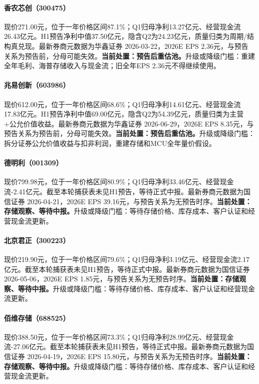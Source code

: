 \paragraph{香农芯创（300475）}
现价271.00元，位于一年价格区间87.1\%；Q1归母净利13.27亿元、经营现金流26.43亿元。H1预告净利中值37.50亿元，隐含Q2为24.23亿元，质量归类为周期/结构真兑现。最新券商元数据为华鑫证券 2026-03-22，2026E EPS 2.36元，与预告关系为预告前，分母可能失效。\textbf{当前处置：预告后重估池。}升级或降级门槛：重建全年毛利、海普存储收入与现金流；旧全年EPS 2.36元不得继续使用。

\paragraph{兆易创新（603986）}
现价612.00元，位于一年价格区间68.6\%；Q1归母净利14.61亿元、经营现金流17.83亿元。H1预告净利中值69.00亿元，隐含Q2为54.39亿元，质量归类为主营+公允价值收益。最新券商元数据为华鑫证券 2026-06-29，2026E EPS 8.35元，与预告关系为预告前，分母可能失效。\textbf{当前处置：预告后重估池。}升级或降级门槛：拆分证券公允价值收益与扣非利润，重建存储和MCU全年量价假设。

\paragraph{德明利（001309）}
现价799.98元，位于一年价格区间80.9\%；Q1归母净利33.46亿元、经营现金流-2.41亿元。截至本轮捕获表未见H1预告，等待正式中报。最新券商元数据为国信证券 2026-04-21，2026E EPS 39.16元，与预告关系为无预告时序。\textbf{当前处置：存储观察、等待中报。}升级或降级门槛：等待存储价格、库存成本、客户认证和经营现金流更新。

\paragraph{北京君正（300223）}
现价219.90元，位于一年价格区间79.6\%；Q1归母净利3.19亿元、经营现金流2.17亿元。截至本轮捕获表未见H1预告，等待正式中报。最新券商元数据为国信证券 2026-05-06，2026E EPS 1.85元，与预告关系为无预告时序。\textbf{当前处置：存储观察、等待中报。}升级或降级门槛：等待存储价格、库存成本、客户认证和经营现金流更新。

\paragraph{佰维存储（688525）}
现价388.50元，位于一年价格区间73.3\%；Q1归母净利28.99亿元、经营现金流-27.06亿元。截至本轮捕获表未见H1预告，等待正式中报。最新券商元数据为国信证券 2026-04-19，2026E EPS 15.80元，与预告关系为无预告时序。\textbf{当前处置：存储观察、等待中报。}升级或降级门槛：等待存储价格、库存成本、客户认证和经营现金流更新。


